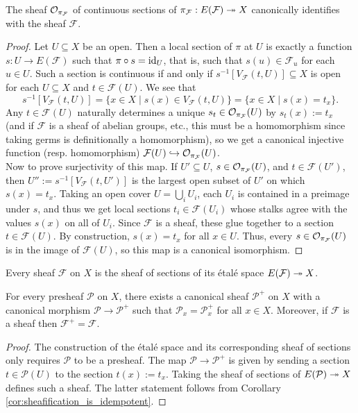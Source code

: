 \begin{prop}
	The sheaf $\mathcal{O}_{\pi_\mathcal{F}}$ of continuous sections of $\pi_{\mathcal{F}} : E(\mathcal{F}) \twoheadrightarrow X$ canonically identifies with the sheaf $\mathcal{F}$.
\end{prop}
\begin{proof}
	Let $U \subseteq X$ be an open. Then a local section of $\pi$ at $U$ is exactly a function $s : U \to E(\mathcal{F})$ such that $\pi \circ s = \mathrm{id}_U$, that is, such that $s(u) \in \mathcal{F}_u$ for each $u \in U$. Such a section is continuous if and only if $s^{-1}[V_{\mathcal{F}}(t, U)] \subseteq X$ is open for each $U \subseteq X$ and $t \in \mathcal{F}(U)$. We see that 
	\[
		s^{-1}[V_{\mathcal{F}}(t,U)] = \{ x \in X \mid s(x) \in V_{\mathcal{F}}(t, U)\} = \{x \in X \mid s(x) = t_x\}.
	\]
	Any $t \in \mathcal{F}(U)$ naturally determines a unique $s_t \in \mathcal{O}_{\pi_\mathcal{F}}(U)$ by $s_t(x) := t_x$ (and if $\mathcal{F}$ is a sheaf of abelian groups, etc., this must be a homomorphism since taking germs is definitionally a homomorphism), so we get a canonical injective function (resp. homomorphism) $\mathcal{F}(U) \hookrightarrow \mathcal{O}_{\pi_\mathcal{F}}(U)$.\\ 
	
	Now to prove surjectivity of this map. If $U' \subseteq U$, $s \in \mathcal{O}_{\pi_{\mathcal{F}}}(U)$, and $t \in \mathcal{F}(U')$, then $U'' := s^{-1}[V_\mathcal{F}(t, U')]$ is the largest open subset of $U'$ on which $s(x) = t_x$. Taking an open cover $U = \bigcup_i U_i$, each $U_i$ is contained in a preimage under $s$, and thus we get local sections $t_i \in \mathcal{F}(U_i)$ whose stalks agree with the values $s(x)$ on all of $U_i$. Since $\mathcal{F}$ is a sheaf, these glue together to a section $t \in \mathcal{F}(U)$. By construction, $s(x) = t_x$ for all $x \in U$. Thus, every $s \in \mathcal{O}_{\pi_\mathcal{F}}(U)$ is in the image of $\mathcal{F}(U)$, so this map is a canonical isomorphism.
\end{proof}

\begin{cor}
	\label{cor:sheafification_is_idempotent}
	Every sheaf $\mathcal{F}$ on $X$ is the sheaf of sections of its \'etal\'e space $E(\mathcal{F}) \twoheadrightarrow X$.
\end{cor}

\begin{cor}
	\label{cor:sheafification_existence}
	For every presheaf $\mathcal{P}$ on $X$, there exists a canonical sheaf $\mathcal{P}^+$ on $X$ with a canonical morphism $\mathcal{P} \to \mathcal{P}^+$ such that $\mathcal{P}_x = \mathcal{P}^+_x$ for all $x \in X$. Moreover, if $\mathcal{F}$ is a sheaf then $\mathcal{F}^+ = \mathcal{F}$.
\end{cor}
\begin{proof}
	The construction of the \'etal\'e space and its corresponding sheaf of sections only requires $\mathcal{P}$ to be a presheaf. The map $\mathcal{P} \to \mathcal{P}^+$ is given by sending a section $t \in \mathcal{P}(U)$ to the section $t(x) := t_x$. Taking the sheaf of sections of $E(\mathcal{P}) \twoheadrightarrow X$ defines such a sheaf. The latter statement follows from Corollary \ref{cor:sheafification_is_idempotent}.
\end{proof}

